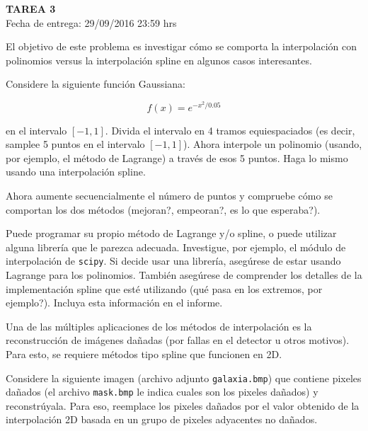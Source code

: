 \documentclass[letter, 11pt]{article}
\newcommand{\tareanro}{3}
\newcommand{\fechaentrega}{29/09/2016 23:59 hrs}
\begin{document}
\thispagestyle{firstpage}

\begin{center}
  {\uppercase{\LARGE \bf Tarea \tareanro}}\\
  Fecha de entrega: \fechaentrega
\end{center}



El objetivo de este problema es investigar cómo se comporta la interpolación
con polinomios versus la interpolación spline en algunos casos interesantes.

Considere la siguiente función Gaussiana:

$$ f(x) = e^{-x^2/0.05} $$

\noindent en el intervalo $[-1, 1]$. Divida el intervalo en 4 tramos
equiespaciados (es decir, samplee 5 puntos en el intervalo $[-1, 1]$). Ahora
interpole un polinomio (usando, por ejemplo, el método de Lagrange) a través de
esos 5 puntos. Haga lo mismo usando una interpolación spline.

Ahora aumente secuencialmente el número de puntos y compruebe cómo se comportan
los dos métodos (mejoran?, empeoran?, es lo que esperaba?).

\begin{ayuda}

  Puede programar su propio método de Lagrange y/o spline, o puede utilizar
  alguna librería que le parezca adecuada. Investigue, por ejemplo, el módulo
  de interpolación de \texttt{scipy}. Si decide usar una librería, asegúrese de
  estar usando Lagrange para los polinomios. También asegúrese de comprender
  los detalles de la implementación spline que esté utilizando (qué pasa en los
  extremos, por ejemplo?). Incluya esta información en el informe.
\end{ayuda}

\vspace{1em}

Una de las múltiples aplicaciones de los métodos de interpolación es la
reconstrucción de imágenes dañadas (por fallas en el detector u otros motivos).
Para esto, se requiere métodos tipo spline que funcionen en 2D.

Considere la siguiente imagen (archivo adjunto \texttt{galaxia.bmp}) que
contiene pixeles dañados (el archivo \texttt{mask.bmp} le indica cuales son los
pixeles dañados) y reconstrúyala. Para eso, reemplace los pixeles dañados por
el valor obtenido de la interpolación 2D basada en un grupo de pixeles
adyacentes no dañados.
\end{document}
